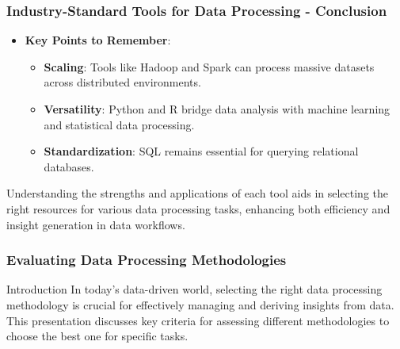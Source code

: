 \documentclass[aspectratio=169]{beamer}
\begin{document}
\begin{frame}[fragile]
    \frametitle{Industry-Standard Tools for Data Processing - Conclusion}
    \begin{itemize}
        \item \textbf{Key Points to Remember}:
        \begin{itemize}
            \item \textbf{Scaling}: Tools like Hadoop and Spark can process massive datasets across distributed environments.
            \item \textbf{Versatility}: Python and R bridge data analysis with machine learning and statistical data processing.
            \item \textbf{Standardization}: SQL remains essential for querying relational databases.
        \end{itemize}
    \end{itemize}
    Understanding the strengths and applications of each tool aids in selecting the right resources for various data processing tasks, enhancing both efficiency and insight generation in data workflows.
\end{frame}

\begin{frame}[fragile]
    \frametitle{Evaluating Data Processing Methodologies}
    \begin{block}{Introduction}
        In today's data-driven world, selecting the right data processing methodology is crucial for effectively managing and deriving insights from data. This presentation discusses key criteria for assessing different methodologies to choose the best one for specific tasks.
    \end{block}
\end{frame}
\end{document}
